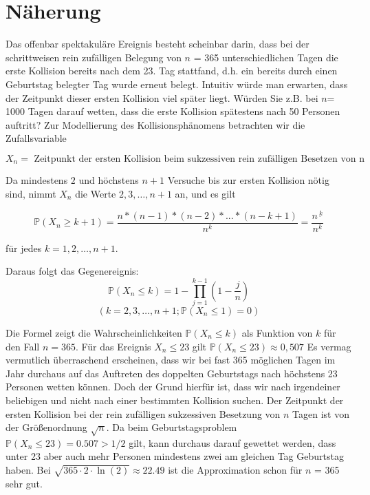 \documentclass[../main.tex]{subfiles}
\begin{document}
    \section{Näherung}

    Das offenbar spektakuläre Ereignis besteht scheinbar darin, dass bei der schrittweisen rein zufälligen Belegung
    von \(n\) = 365 unterschiedlichen Tagen die erste Kollision bereits nach dem 23. Tag stattfand, d.h. ein bereits
    durch einen Geburtstag belegter Tag wurde erneut belegt.
    Intuitiv würde man erwarten, dass der Zeitpunkt dieser
    ersten Kollision viel später liegt.
    Würden Sie z.B. bei \(n\)= 1000 Tagen darauf wetten, dass die erste Kollision
    spätestens nach 50 Personen auftritt? \cite[69]{henze}
    \newline
    Zur Modellierung des Kollisionsphänomens betrachten wir die Zufallsvariable
    \newline

    \[{ X_{n} = \text{ Zeitpunkt der ersten Kollision beim sukzessiven rein zufälligen Besetzen von n Tagen. } }\]\label{eq:equation}

    \newline
    Da mindestens \(2\) und höchstens \(n + 1\) Versuche bis zur ersten Kollision nötig sind, nimmt \(X_n\) die
    Werte \(2,3,\dots, n + 1\) an, und es gilt

    \[\mathbb{P}(X_{n} \geq k+1) = \frac {n*(n-1)*(n-2)* ... * (n-k + 1)}{n^k} = \frac{n^{\underline{\ k}}}{n^k}\]

    \newline\newline
    für jedes \(k = 1,2,\dots,n+1\).\label{eq:equation2}

    \newline
    Daraus folgt das Gegenereignis:
    \newline
    \[\mathbb{P}(X_{n} \leq k) = 1-\prod \limits_{j=1}^{k-1}(1- \frac{j}{n})\]
    \[(k=2,3,\dots,n+1; \mathbb{P}(X_n\leq1) = 0)\]
    \newline\label{eq:equation3}

    Die Formel zeigt die Wahrscheinlichkeiten \(\mathbb{P}(X_{n} \leq k)\) als Funktion von \(k\) für den Fall \(n = 365\).
    Für das Ereignis \({X_{n} \leq 23}\) gilt \( \mathbb{P}(X_{n} \leq 23) \approx 0,507 \)
    \newline
    Es vermag vermutlich überraschend erscheinen, dass wir bei fast 365 möglichen Tagen im Jahr durchaus auf das
    Auftreten des doppelten Geburtstags nach höchstens 23 Personen wetten können.
    Doch der Grund hierfür ist, dass wir nach irgendeiner beliebigen und nicht nach einer bestimmten Kollision suchen.
    Der Zeitpunkt der ersten Kollision bei der rein zufälligen sukzessiven Besetzung von \(n\) Tagen ist von
    der Größenordnung \(\sqrt{n}\). \cite[70]{henze}
    \newline
    \newline
    Da beim Geburtstagsproblem  \(\mathbb{P} (X_n \leq 23) = 0.507 > 1/2\) gilt, kann durchaus darauf gewettet werden,
    dass unter 23 aber auch mehr Personen mindestens zwei am gleichen Tag Geburtstag haben. Bei
    \(\sqrt{365 \cdot 2 \cdot \ln(2)} \approx 22.49\)
    ist die Approximation schon für \(n\) = 365 sehr gut. \cite[70]{henze}
\end{document}
